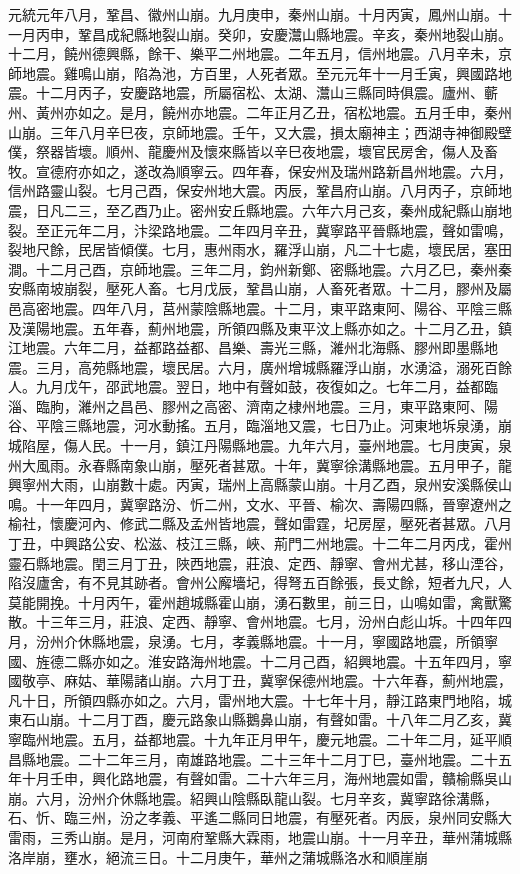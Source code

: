 \begin{pinyinscope}
 元統元年八月，鞏昌、徽州山崩。九月庚申，秦州山崩。十月丙寅，鳳州山崩。十一月丙申，鞏昌成紀縣地裂山崩。癸卯，安慶灊山縣地震。辛亥，秦州地裂山崩。十二月，饒州德興縣，餘干、樂平二州地震。二年五月，信州地震。八月辛未，京師地震。雞鳴山崩，陷為池，方百里，人死者眾。至元元年十一月壬寅，興國路地震。十二月丙子，安慶路地震，所屬宿松、太湖、灊山三縣同時俱震。廬州、蘄州、黃州亦如之。是月，饒州亦地震。二年正月乙丑，宿松地震。五月壬申，秦州山崩。三年八月辛巳夜，京師地震。壬午，又大震，損太廟神主；西湖寺神御殿壁僕，祭器皆壞。順州、龍慶州及懷來縣皆以辛巳夜地震，壞官民房舍，傷人及畜牧。宣德府亦如之，遂改為順寧云。四年春，保安州及瑞州路新昌州地震。六月，信州路靈山裂。七月己酉，保安州地大震。丙辰，鞏昌府山崩。八月丙子，京師地震，日凡二三，至乙酉乃止。密州安丘縣地震。六年六月己亥，秦州成紀縣山崩地裂。至正元年二月，汴梁路地震。二年四月辛丑，冀寧路平晉縣地震，聲如雷鳴，裂地尺餘，民居皆傾僕。七月，惠州雨水，羅浮山崩，凡二十七處，壞民居，塞田澗。十二月己酉，京師地震。三年二月，鈞州新鄭、密縣地震。六月乙巳，秦州秦安縣南坡崩裂，壓死人畜。七月戊辰，鞏昌山崩，人畜死者眾。十二月，膠州及屬邑高密地震。四年八月，莒州蒙陰縣地震。十二月，東平路東阿、陽谷、平陰三縣及漢陽地震。五年春，薊州地震，所領四縣及東平汶上縣亦如之。十二月乙丑，鎮江地震。六年二月，益都路益都、昌樂、壽光三縣，濰州北海縣、膠州即墨縣地震。三月，高苑縣地震，壞民居。六月，廣州增城縣羅浮山崩，水湧溢，溺死百餘人。九月戊午，邵武地震。翌日，地中有聲如鼓，夜復如之。七年二月，益都臨淄、臨朐，濰州之昌邑、膠州之高密、濟南之棣州地震。三月，東平路東阿、陽谷、平陰三縣地震，河水動搖。五月，臨淄地又震，七日乃止。河東地坼泉湧，崩城陷屋，傷人民。十一月，鎮江丹陽縣地震。九年六月，臺州地震。七月庚寅，泉州大風雨。永春縣南象山崩，壓死者甚眾。十年，冀寧徐溝縣地震。五月甲子，龍興寧州大雨，山崩數十處。丙寅，瑞州上高縣蒙山崩。十月乙酉，泉州安溪縣侯山鳴。十一年四月，冀寧路汾、忻二州，文水、平晉、榆次、壽陽四縣，晉寧遼州之榆社，懷慶河內、修武二縣及孟州皆地震，聲如雷霆，圮房屋，壓死者甚眾。八月丁丑，中興路公安、松滋、枝江三縣，峽、荊門二州地震。十二年二月丙戌，霍州靈石縣地震。閏三月丁丑，陜西地震，莊浪、定西、靜寧、會州尤甚，移山湮谷，陷沒廬舍，有不見其跡者。會州公廨墻圮，得弩五百餘張，長丈餘，短者九尺，人莫能開挽。十月丙午，霍州趙城縣霍山崩，湧石數里，前三日，山鳴如雷，禽獸驚散。十三年三月，莊浪、定西、靜寧、會州地震。七月，汾州白彪山坼。十四年四月，汾州介休縣地震，泉湧。七月，孝義縣地震。十一月，寧國路地震，所領寧國、旌德二縣亦如之。淮安路海州地震。十二月己酉，紹興地震。十五年四月，寧國敬亭、麻姑、華陽諸山崩。六月丁丑，冀寧保德州地震。十六年春，薊州地震，凡十日，所領四縣亦如之。六月，雷州地大震。十七年十月，靜江路東門地陷，城東石山崩。十二月丁酉，慶元路象山縣鵝鼻山崩，有聲如雷。十八年二月乙亥，冀寧臨州地震。五月，益都地震。十九年正月甲午，慶元地震。二十年二月，延平順昌縣地震。二十二年三月，南雄路地震。二十三年十二月丁巳，臺州地震。二十五年十月壬申，興化路地震，有聲如雷。二十六年三月，海州地震如雷，贛榆縣吳山崩。六月，汾州介休縣地震。紹興山陰縣臥龍山裂。七月辛亥，冀寧路徐溝縣，石、忻、臨三州，汾之孝義、平遙二縣同日地震，有壓死者。丙辰，泉州同安縣大雷雨，三秀山崩。是月，河南府鞏縣大霖雨，地震山崩。十一月辛丑，華州蒲城縣洛岸崩，壅水，絕流三日。十二月庚午，華州之蒲城縣洛水和順崖崩
\end{pinyinscope}
